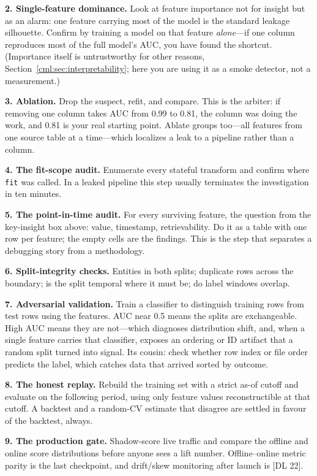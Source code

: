 \textbf{2. Single-feature dominance.} Look at feature importance not for insight but as an alarm: one feature carrying most of the model is the standard leakage silhouette. Confirm by training a model on that feature \emph{alone}---if one column reproduces most of the full model's AUC, you have found the shortcut. (Importance itself is untrustworthy for other reasons, Section~\ref{cml:sec:interpretability}; here you are using it as a smoke detector, not a measurement.)

\textbf{3. Ablation.} Drop the suspect, refit, and compare. This is the arbiter: if removing one column takes AUC from 0.99 to 0.81, the column was doing the work, and 0.81 is your real starting point. Ablate groups too---all features from one source table at a time---which localizes a leak to a pipeline rather than a column.

\textbf{4. The fit-scope audit.} Enumerate every stateful transform and confirm where \texttt{fit} was called. In a leaked pipeline this step usually terminates the investigation in ten minutes.

\textbf{5. The point-in-time audit.} For every surviving feature, the question from the key-insight box above: value, timestamp, retrievability. Do it as a table with one row per feature; the empty cells are the findings. This is the step that separates a debugging story from a methodology.

\textbf{6. Split-integrity checks.} Entities in both splits; duplicate rows across the boundary; is the split temporal where it must be; do label windows overlap.

\textbf{7. Adversarial validation.} Train a classifier to distinguish training rows from test rows using the features. AUC near 0.5 means the splits are exchangeable. High AUC means they are not---which diagnoses distribution shift, and, when a single feature carries that classifier, exposes an ordering or ID artifact that a random split turned into signal. Its cousin: check whether row index or file order predicts the label, which catches data that arrived sorted by outcome.

\textbf{8. The honest replay.} Rebuild the training set with a strict as-of cutoff and evaluate on the following period, using only feature values reconstructible at that cutoff. A backtest and a random-CV estimate that disagree are settled in favour of the backtest, always.

\textbf{9. The production gate.} Shadow-score live traffic and compare the offline and online score distributions before anyone sees a lift number. Offline--online metric parity is the last checkpoint, and drift/skew monitoring after launch is [DL 22].

